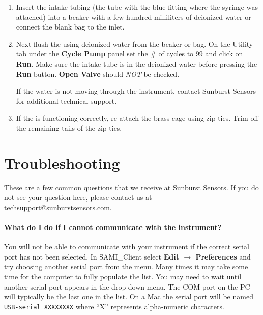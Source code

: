 \begin{enumerate}
    \item Insert the intake tubing (the tube with the blue fitting where the syringe was attached) into a beaker with a few hundred milliliters of deionized water or connect the blank bag to the inlet. 
    
    \item Next flush the \instType{} using deionized water from the beaker or bag. On the Utility tab under the \textbf{Cycle Pump} panel set the \# of cycles to 99 and click on \textbf{Run}. Make sure the intake tube is in the deionized water before pressing the \textbf{Run} button.  \textbf{Open Valve} should \textit{NOT} be checked.
    
    If the water is not moving through the instrument, contact Sunburst Sensors for additional technical support.
   
\ifcase \inst	%


\or			%

    \item If the \instType{} is functioning correctly, re-attach the brass cage using zip ties. Trim off the remaining tails of the zip ties.

\or			%

    
\fi

\end{enumerate}

\clearpage


\section{Troubleshooting}

These are a few common questions that we receive at Sunburst Sensors. If you do not see your question here, please contact us at techsupport@sunburstsensors.com. 

\paragraph{\underline{What do I do if I cannot communicate with the instrument?}}
You will not be able to communicate with your instrument if the correct serial port has not been selected. In SAMI\_Client select \textbf{Edit $\rightarrow$ Preferences} and try choosing another serial port from the menu. Many times it may take some time for the computer to fully populate the list. You may need to wait until another serial port appears in the drop-down menu.  The COM port on the PC will typically be the last one in the list. On a Mac the serial port will be named \verb|USB-serial XXXXXXXX| where ``X'' represents alpha-numeric characters.

